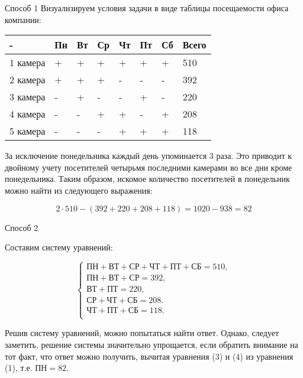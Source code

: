 \solutionSection
Способ 1
Визуализируем условия задачи в виде таблицы посещаемости офиса компании:

\begin{tabular}{ | l | l | l | l | l | l | l | l |}
\hline
  -      & Пн & Вт & Ср & Чт & Пт & Сб & Всего \\ \hline
1 камера & + & + & + & + & + & + & 510 \\
2 камера & + & + & + & - & - & - & 392 \\
3 камера & - & + & - & - & + & - & 220 \\
4 камера & - & - & + & + & - & + & 208 \\
5 камера & - & - & - & + & + & + & 118 \\
\hline
\end{tabular}

За исключение понедельника каждый день упоминается 3 раза. Это приводит к двойному учету посетителей четырьмя последними камерами во все дни кроме понедельника. Таким образом, искомое количество посетителей в понедельник можно найти из следующего выражения:

\begin{displaymath}
2 \cdot 510-(392+220+208+118)=1020-938=82
\end{displaymath}

Способ 2

Составим систему уравнений:

\begin{equation*}
   \begin{cases}
    \text{ПН}+\text{ВТ}+\text{СР}+\text{ЧТ}+\text{ПТ}+\text{СБ}=510,\\
    \text{ПН}+\text{ВТ}+\text{СР} =392, \\
    \text{ВТ}+ \text{ПТ}=220, \\
    \text{СР}+\text{ЧТ}+ \text{СБ}=208. \\
    \text{ЧТ}+\text{ПТ}+\text{СБ}=118. \\ 
   \end{cases}
  \end{equation*}

Решив систему уравнений, можно попытаться найти ответ. Однако, следует заметить, решение системы значительно упрощается, если обратить внимание на тот факт, что ответ можно получить, вычитая уравнения (3) и (4) из уравнения (1), т.е. $\text{ПН} = 82$.

